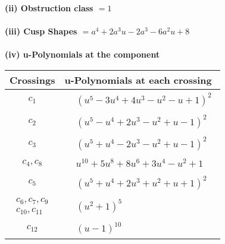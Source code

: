 \documentclass[1p]{elsarticle_modified}
\theoremstyle{definition}
\begin{document}
\flushleft \textbf{(ii) Obstruction class $= 1$}\\~\\
\flushleft \textbf{(iii) Cusp Shapes $= a^4+2 a^3 u-2 a^3-6 a^2 u+8$}\\~\\
\newpage\renewcommand{\arraystretch}{1}
\flushleft \textbf{(iv) u-Polynomials at the component}\newline \\
\begin{tabular}{m{50pt}|m{274pt}}
Crossings & \hspace{64pt}u-Polynomials at each crossing \\
\hline $$\begin{aligned}c_{1}\end{aligned}$$&$\begin{aligned}
&(u^5-3 u^4+4 u^3- u^2- u+1)^2
\end{aligned}$\\
\hline $$\begin{aligned}c_{2}\end{aligned}$$&$\begin{aligned}
&(u^5- u^4+2 u^3- u^2+u-1)^2
\end{aligned}$\\
\hline $$\begin{aligned}c_{3}\end{aligned}$$&$\begin{aligned}
&(u^5+u^4-2 u^3- u^2+u-1)^2
\end{aligned}$\\
\hline $$\begin{aligned}c_{4},c_{8}\end{aligned}$$&$\begin{aligned}
&u^{10}+5 u^8+8 u^6+3 u^4- u^2+1
\end{aligned}$\\
\hline $$\begin{aligned}c_{5}\end{aligned}$$&$\begin{aligned}
&(u^5+u^4+2 u^3+u^2+u+1)^2
\end{aligned}$\\
\hline $$\begin{aligned}c_{6},c_{7},c_{9}\\c_{10},c_{11}\end{aligned}$$&$\begin{aligned}
&(u^2+1)^5
\end{aligned}$\\
\hline $$\begin{aligned}c_{12}\end{aligned}$$&$\begin{aligned}
&(u-1)^{10}
\end{aligned}$\\
\hline
\end{tabular}\\~\\
\end{document}
